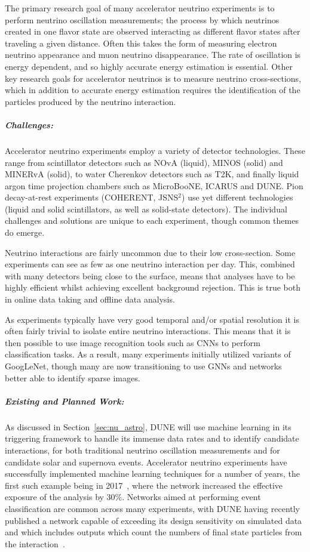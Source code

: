     The primary research goal of many accelerator neutrino experiments is to perform neutrino oscillation measurements; the process by which neutrinos created in one flavor state are observed interacting as different flavor states after traveling a given distance. Often this takes the form of measuring electron neutrino appearance and muon neutrino disappearance. The rate of oscillation is energy dependent, and so highly accurate energy estimation is essential. Other key research goals for accelerator neutrinos is to measure neutrino cross-sections, which in addition to accurate energy estimation requires the identification of the particles produced by the neutrino interaction. 
    
\subparagraph*{Challenges:} Accelerator neutrino experiments employ a variety of detector technologies. These range from scintillator detectors such as NOvA (liquid), MINOS (solid) and MINERvA (solid), to water Cherenkov detectors such as T2K, and finally liquid argon time projection chambers such as MicroBooNE, ICARUS and DUNE. Pion decay-at-rest experiments (COHERENT, JSNS$^2$) use yet different technologies (liquid and solid scintillators, as well as solid-state detectors). The individual challenges and solutions are unique to each experiment, though common themes do emerge.
    
    Neutrino interactions are fairly uncommon due to their low cross-section. Some experiments can see as few as one neutrino interaction per day. This, combined with many detectors being close to the surface, means that analyses have to be highly efficient whilst achieving excellent background rejection. This is true both in online data taking and offline data analysis.
    
    As experiments typically have very good temporal and/or spatial resolution it is often fairly trivial to isolate entire neutrino interactions. This means that it is then possible to use image recognition tools such as CNNs to perform classification tasks. As a result, many experiments initially utilized variants of GoogLeNet, though many are now transitioning to use GNNs and networks better able to identify sparse images. 

\subparagraph*{Existing and Planned Work:} As discussed in Section~\ref{sec:nu_astro}, DUNE will use machine learning in its triggering framework to handle its immense data rates and to identify candidate interactions, for both traditional neutrino oscillation measurements and for candidate solar and supernova events. Accelerator neutrino experiments have successfully implemented machine learning techniques for a number of years, the first such example being in 2017~\cite{Adamson_2017}, where the network increased the effective exposure of the analysis by 30\%. Networks aimed at performing event classification are common across many experiments, with DUNE having recently published a network capable of exceeding its design sensitivity on simulated data and which includes outputs which count the numbers of final state particles from the interaction~\cite{Abi_2020}.
    
